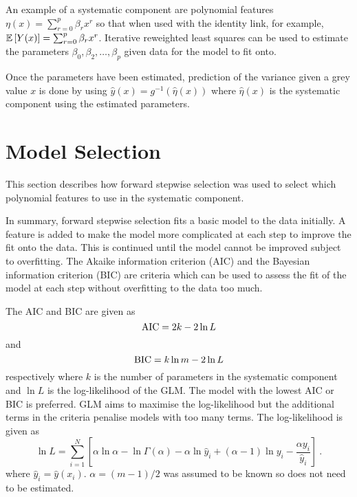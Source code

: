 An example of a systematic component are polynomial features $\eta(x)=\sum_{r=0}^{p}\beta_r x^{r}$ so that when used with the identity link, for example, $\operatorname{\mathbb{E}}\left[Y(x)\right] = \sum_{r=0}^{p}\beta_r x^{r}$. Iterative reweighted least squares \citep{friedman2001elements} can be used to estimate the parameters $\beta_0, \beta_2, \dotsc, \beta_{p}$ given data for the model to fit onto.

Once the parameters have been estimated, prediction of the variance given a grey value $x$ is done by using $\widehat{y}(x) = g^{-1}(\widehat{\eta}(x))$ where $\widehat{\eta}(x)$ is the systematic component using the estimated parameters.

\section{Model Selection}

This section describes how forward stepwise selection \citep{efroymson1960multiple, friedman2001elements} was used to select which polynomial features to use in the systematic component.

In summary, forward stepwise selection fits a basic model to the data initially. A feature is added to make the model more complicated at each step to improve the fit onto the data. This is continued until the model cannot be improved subject to overfitting. The Akaike information criterion (AIC) \citep{akaike1974new, friedman2001elements} and the Bayesian information criterion (BIC) \citep{schwarz1978estimating, friedman2001elements} are criteria which can be used to assess the fit of the model at each step without overfitting to the data too much.

The AIC and BIC are given as
\begin{equation}
\mathrm{AIC} = 2k-2\ln L
\end{equation}
and
\begin{equation}
\mathrm{BIC} = k\ln m - 2\ln L
\end{equation}
respectively where $k$ is the number of parameters in the systematic component and $\ln L$ is the log-likelihood of the GLM. The model with the lowest AIC or BIC is preferred. GLM aims to maximise the log-likelihood but the additional terms in the criteria penalise models with too many terms. The log-likelihood is given as
\begin{equation}
  \ln L = \sum_{i=1}^N \left[
    \alpha\ln\alpha
    -\ln\Gamma(\alpha)
    -\alpha\ln \widehat{y}_i
    +(\alpha-1)\ln y_i
    -\frac{\alpha y_i}{\widehat{y}_i}
  \right]
  \ .
\end{equation}
where $\widehat{y}_i=\widehat{y}(x_i)$. $\alpha=(m-1)/2$ was assumed to be known so does not need to be estimated.

